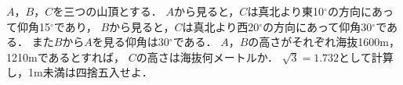 \documentclass[../../main.tex]{subfiles}
\begin{document}
$A$，$B$，$C$を三つの山頂とする．
$A$から見ると，$C$は真北より東10$^\circ$の方向にあって仰角15$^\circ$であり，
$B$から見ると，$C$は真北より西20$^\circ$の方向にあって仰角30$^\circ$である．
また$B$から$A$を見る仰角は30$^\circ$である．
$A$，$B$の高さがそれぞれ海抜1600m，1210mであるとすれば，
$C$の高さは海抜何メートルか．
$\sqrt3=1.732$として計算し，1m未満は四捨五入せよ．
\end{document}

